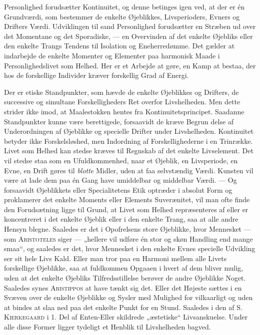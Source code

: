 \documentclass[12pt,a4paper,openany]{book}
\newcommand{\opage}[1]{\marginnote{\footnotesize\textit{[#1]}}}
\begin{document}
Personlighed forudsætter Kontinuitet, og denne betinges igen ved, at der er én
Grundværdi, som bestemmer de enkelte Øjeblikkes, Livsperioders, Evners og
Drifters Værdi. Udviklingen til sand Personlighed forudsætter en Stræben ud
over det Momentane og det Sporadiske, --- en Overvinden af det enkelte Øjebliks
eller den enkelte Trangs Tendens til Isolation og Eneherredømme. Det gælder at
indarbejde de enkelte Momenter og Elementer paa harmonisk Maade i
Personlighedslivet som Helhed. Her er et Arbejde at gøre, en Kamp at bestaa,
der hos de forskellige Individer kræver forskellig Grad af Energi.

Der er etiske Standpunkter, som hævde de enkelte Øjeblikkes og Drifters, de
successive og simultane Forskelligheders Ret overfor Livshelheden. Men dette
strider ikke imod, at Maalestokken hentes fra Kontinuitetsprincipet. Saadanne
Standpunkter kunne være berettigede, forsaavidt de kræve Begrun%
\opage{73}delse af Underordningen af Øjeblikke og specielle Drifter under
Livshelheden. Kontinuitet betyder ikke Forskelsløshed, men Indordning af
Forskellighederne i en Trinrække. Livet som Helhed kan stedse kræves til
Regnskab af det enkelte Livselement. Det vil stedse staa som en Ufuldkommenhed,
naar et Øjeblik, en Livsperiode, en Evne, en Drift gøres til \textit{blotte}
Midler, uden at faa selvstændig Værdi. Kunsten vil være at lade dem paa én Gang
have umiddelbar og middelbar Værdi. --- Og forsaavidt Øjeblikkets eller
Specialitetens Etik optræder i absolut Form og proklamerer det enkelte Moments
eller Elements Suverænitet, vil man ofte finde den Forudsætning ligge til
Grund, at Livet som Helhed repræsenteres af eller er koncentreret i det enkelte
Øjeblik eller i den enkelte Trang, saa at alle andre Hensyn blegne. Saaledes er
det i Opofrelsens store Øjeblikke, hvor Mennesket --- som \textsc{Aristoteles}
siger --- „hellere vil udføre én stor og skøn Handling end mange smaa“, og
saaledes er det, hvor Mennesket i den enkelte Evnes specielle Udvikling ser sit
hele Livs Kald. Eller man tror paa en Harmoni mellem alle Livets forskellige
Øjeblikke, saa at fuldkommen Opgaaen i hvert af dem bliver mulig, uden at det
enkelte Øjebliks Tilfredsstillelse berøver de andre Øjeblikke Noget. Saaledes
synes \textsc{Aristippos} at have tænkt sig det. Eller det Højeste sættes i en
Svæven over de enkelte Øjeblikke og Sysler med Mulighed for vilkaarligt og uden
at bindes at slaa ned paa det enkelte Punkt for en Stund. Saaledes i den af
\textsc{S. Kierkegaard} i 1. Del af Enten-Eller skildrede „æstetiske“
Livsanskuelse. Under alle disse Former ligger tydeligt et Henblik til
Livshelheden bagved.
\end{document}
